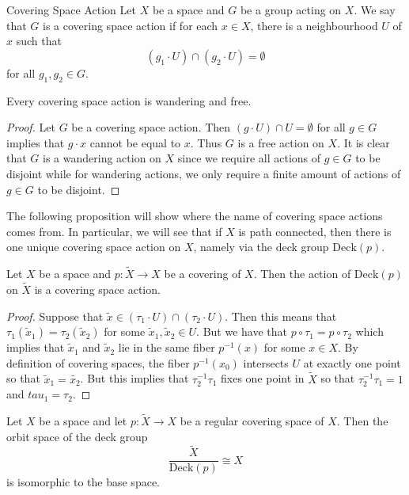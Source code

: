 \documentclass[a4paper]{article}
\begin{document}
\begin{defn}{Covering Space Action}{} Let $X$ be a space and $G$ be a group acting on $X$. We say that $G$ is a covering space action if for each $x\in X$, there is a neighbourhood $U$ of $x$ such that $$(g_1\cdot U)\cap(g_2\cdot U)=\emptyset$$ for all $g_1,g_2\in G$. 
\end{defn}

\begin{lmm}{}{} Every covering space action is wandering and free. \tcbline
\begin{proof}
Let $G$ be a covering space action. Then $(g\cdot U)\cap U=\emptyset$ for all $g\in G$ implies that $g\cdot x$ cannot be equal to $x$. Thus $G$ is a free action on $X$. It is clear that $G$ is a wandering action on $X$ since we require all actions of $g\in G$ to be disjoint while for wandering actions, we only require a finite amount of actions of $g\in G$ to be disjoint. 
\end{proof}
\end{lmm}

The following proposition will show where the name of covering space actions comes from. In particular, we will see that if $X$ is path connected, then there is one unique covering space action on $X$, namely via the deck group $\text{Deck}(p)$. 

\begin{prp}{}{} Let $X$ be a space and $p:\tilde{X}\to X$ be a covering of $X$. Then the action of $\text{Deck}(p)$ on $\tilde{X}$ is a covering space action. \tcbline
\begin{proof}
Suppose that $\tilde{x}\in(\tau_1\cdot U)\cap(\tau_2\cdot U)$. Then this means that $\tau_1(\tilde{x}_1)=\tau_2(\tilde{x}_2)$ for some $\tilde{x}_1,\tilde{x}_2\in U$. But we have that $p\circ\tau_1=p\circ\tau_2$ which implies that $\tilde{x}_1$ and $\tilde{x}_2$ lie in the same fiber $p^{-1}(x)$ for some $x\in X$. By definition of covering spaces, the fiber $p^{-1}(x_0)$ intersects $U$ at exactly one point so that $\tilde{x}_1=\tilde{x_2}$. But this implies that $\tau_2^{-1}\tau_1$ fixes one point in $\tilde{X}$ so that $\tau_2^{-1}\tau_1=1$ and $tau_1=\tau_2$. 
\end{proof}
\end{prp}

\begin{lmm}{}{} Let $X$ be a space and let $p:\tilde{X}\to X$ be a regular covering space of $X$. Then the orbit space of the deck group $$\frac{\tilde{X}}{\text{Deck}(p)}\cong X$$ is isomorphic to the base space. 
\end{lmm}
\end{document}
